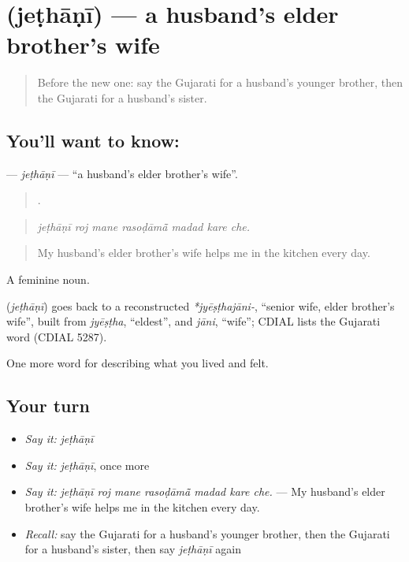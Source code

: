 \section[\texorpdfstring{\gu{જેઠાણી} (jeṭhāṇī)}{જેઠાણી (jeṭhāṇī)}]{ (jeṭhāṇī) — a husband's elder brother's wife}

\label{lesson:GU-C490-jethani}



\begin{quote}
Before the new one: say the Gujarati for a husband's younger brother, then the Gujarati for a husband's sister.
\end{quote}

\subsection*{You'll want to know: }
\textbf{} — \emph{jeṭhāṇī} — \textquotedblleft{}a husband's elder brother's wife\textquotedblright{}.

\begin{quote}
      .
\end{quote}

\begin{quote}
\emph{jeṭhāṇī roj mane rasoḍāmā̃ madad kare che.}
\end{quote}

\begin{quote}
My husband's elder brother's wife helps me in the kitchen every day.
\end{quote}

A feminine noun.

\begin{cousinweb}
\textbf{} (\emph{jeṭhāṇī}) goes back to a reconstructed \emph{*jyēṣṭhajāni-}, \textquotedblleft{}senior wife, elder brother's wife\textquotedblright{}, built from \emph{jyēṣṭha}, \textquotedblleft{}eldest\textquotedblright{}, and \emph{jāni}, \textquotedblleft{}wife\textquotedblright{}; CDIAL lists the Gujarati word (CDIAL 5287).
\end{cousinweb}

\begin{grammarlens}[title={What you've built}]
One more word for describing what you lived and felt.
\end{grammarlens}

\subsection*{Your turn}
\begin{itemize}
\raggedright
  \item \emph{Say it:} \emph{jeṭhāṇī}
  \item \emph{Say it:} \emph{jeṭhāṇī}, once more
  \item \emph{Say it:} \emph{jeṭhāṇī roj mane rasoḍāmā̃ madad kare che.} — My husband's elder brother's wife helps me in the kitchen every day.
  \item \emph{Recall:} say the Gujarati for a husband's younger brother, then the Gujarati for a husband's sister, then say \emph{jeṭhāṇī} again
\end{itemize}

